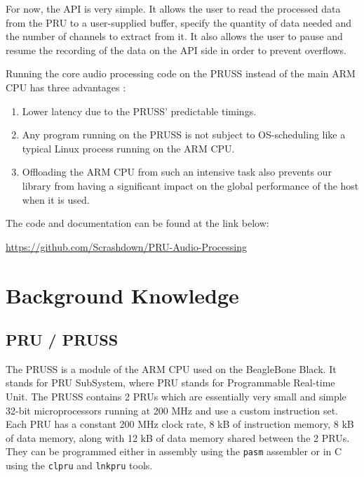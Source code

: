 \documentclass[]{report}
\providecommand{\tightlist}{%
	\setlength{\itemsep}{0pt}\setlength{\parskip}{0pt}}
\begin{document}
For now, the API is very simple. It allows the user to read the processed data from the PRU to a user-supplied buffer, specify the quantity of data needed and the number of channels to extract from it. It also allows the user to pause and resume the recording of the data on the API side in order to prevent overflows.

Running the core audio processing code on the PRUSS instead of the main ARM CPU has three advantages :

\begin{enumerate}
  \tightlist
  \item Lower latency due to the PRUSS' predictable timings.
  \item Any program running on the PRUSS is not subject to OS-scheduling like a typical Linux process running on the ARM CPU.
  \item Offloading the ARM CPU from such an intensive task also prevents our library from having a significant impact on the global performance of the host when it is used.
\end{enumerate}

\noindent The code and documentation can be found at the link below:
\begin{center}
	\url{https://github.com/Scrashdown/PRU-Audio-Processing}
\end{center}

	\chapter{Background Knowledge}
	\label{theory}

\hypertarget{pru-pruss}{%
\section{PRU / PRUSS}\label{pru-pruss}}

The PRUSS is a module of the ARM CPU used on the BeagleBone Black. It stands for PRU SubSystem, where PRU stands for Programmable Real-time Unit. The PRUSS contains 2 PRUs which are essentially very small and simple 32-bit microprocessors running at 200 MHz and use a custom instruction set. Each PRU has a constant 200 MHz clock rate, 8 kB of instruction memory, 8 kB of data memory, along with 12 kB of data memory shared between the 2 PRUs. They can be programmed either in assembly using the \texttt{pasm} assembler or in C using the \texttt{clpru} and \texttt{lnkpru} tools.
\end{document}
